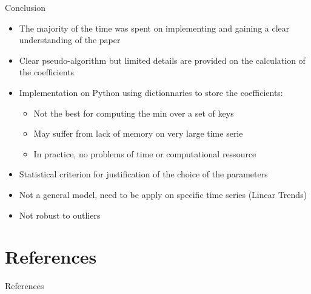 \documentclass[10pt, xcolor=dvipsnames]{beamer}
\begin{document}
\begin{frame}{Conclusion}

\begin{itemize}
    \item The majority of the time was spent on implementing and gaining a clear understanding of the paper
    \item Clear pseudo-algorithm but limited details are provided on the calculation of the coefficients
    \item Implementation on Python using dictionnaries to store the coefficients:
    \begin{itemize}
        \item Not the best for computing the min over a set of keys
        \item May suffer from lack of memory on very large time serie
        \item In practice, no problems of time or  computational ressource 
    \end{itemize}
    \item Statistical criterion for justification of the choice of the parameters
    \item Not a general model, need to be apply on specific time series (Linear Trends)
    \item Not robust to outliers
\end{itemize}
\end{frame}




\section{References}
\begin{frame}[allowframebreaks]{References}
    \footnotesize
    \printbibliography
\end{frame}
\end{document}
